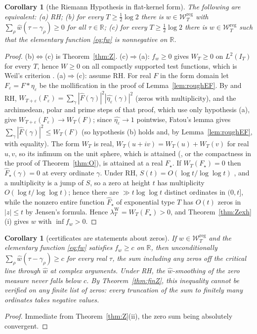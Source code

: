 \documentclass[11pt]{amsart}
\newtheorem{corollary}[theorem]{Corollary}
\theoremstyle{definition}
\theoremstyle{remark}
\newcommand{\R}{\mathbb R}
\newcommand{\IT}{I_T}
\newcommand{\lamW}{\lambda^{\mathrm W}_T}
\newcommand{\wh}{\widehat w}
\newcommand{\Fh}{\widehat F}
\newcommand{\Wcl}{\mathcal W_T}
\begin{document}
\begin{corollary}[the Riemann Hypothesis in flat-kernel form]\label{cor:RH}
The following are equivalent: \emph{(a)} RH; \emph{(b)} for every $T\ge\frac12\log2$ there is
$w\in\Wcl^{\mathrm{reg}}$ with $\sum_\rho\wh(\tau-\gamma_\rho)\ge0$ for all $\tau\in\R$; \emph{(c)} for
every $T\ge\frac12\log2$ there is $w\in\Wcl^{\mathrm{reg}}$ such that the elementary function
\eqref{eq:fw} is nonnegative on $\R$.
\end{corollary}
\begin{proof}
(b)$\iff$(c) is Theorem~\ref{thm:Z}. (c)$\Rightarrow$(a): $f_w\ge0$ gives $W_T\ge0$ on $L^2(\IT)$
for every $T$, hence $W\ge0$ on all compactly supported test functions, which is Weil's
criterion \cite{Weil52,Bombieri2000}. (a)$\Rightarrow$(c): assume RH. For real $F$ in the form
domain let $F_\varepsilon=F*\eta_\varepsilon$ be the mollification in the proof of
Lemma~\ref{lem:roughEF}. By \cite[Thm.~8.4]{Paper45} and RH,
$W_{T+\varepsilon}(F_\varepsilon)=\sum_\gamma|\Fh(\gamma)|^2|\widehat{\eta_\varepsilon}(\gamma)|^2$ (zeros with
multiplicity), and the archimedean, polar and prime steps of that proof, which use only hypothesis (a),
give $W_{T+\varepsilon}(F_\varepsilon)\to W_T(F)$; since $\widehat{\eta_\varepsilon}\to1$ pointwise, Fatou's
lemma gives $\sum_\gamma|\Fh(\gamma)|^2\le W_T(F)$ (so hypothesis (b) holds and, by
Lemma~\ref{lem:roughEF}, with equality). The form $W_T$ is real, $W_T(u+iv)=W_T(u)+W_T(v)$ for real
$u,v$, so its infimum on the unit sphere, which is attained (\cite[Thm.~3]{Bombieri2000}, or the
compactness in the proof of Theorem~\ref{thm:O}), is attained at a real $F_\star$. If $W_T(F_\star)=0$
then $\Fh_\star(\gamma)=0$ at every ordinate $\gamma$. Under RH, $S(t)=O(\log t/\log\log t)$
\cite[Thm.~14.13]{Titchmarsh}, and a multiplicity is a jump of $S$, so a zero at height $t$ has
multiplicity $O(\log t/\log\log t)$; hence there are $\gg t\log\log t$ distinct ordinates in $(0,t]$,
while the nonzero entire function $\Fh_\star$ of exponential type $T$ has $O(t)$ zeros in $|z|\le t$ by
Jensen's formula. Hence $\lamW=W_T(F_\star)>0$, and
Theorem~\ref{thm:Zexh}(i) gives $w$ with $\inf f_w>0$.
\end{proof}

\begin{corollary}[certificates are statements about zeros]\label{cor:zeros}
If $w\in\Wcl^{\mathrm{reg}}$ and the elementary function \eqref{eq:fw} satisfies $f_w\ge c$ on $\R$,
then unconditionally $\sum_\rho\wh(\tau-\gamma_\rho)\ge c$ for every real $\tau$, the sum including
any zeros off the critical line through $\wh$ at complex arguments. Under RH, the
$\wh$-smoothing of the zero measure never falls below $c$. By Theorem~\ref{thm:finZ}, this
inequality cannot be verified on any finite list of zeros: every truncation of the sum to finitely
many ordinates takes negative values.
\end{corollary}
\begin{proof}
Immediate from Theorem~\ref{thm:Z}(ii), the zero sum being absolutely convergent.
\end{proof}
\end{document}
